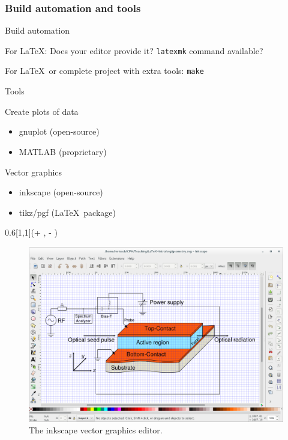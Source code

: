 \documentclass{tum-presentation}
\begin{document}
\begin{frame}
  \frametitle{Build automation and tools}
  Build automation
  \begin{PraesentationAufzaehlung}
  \item For \LaTeX: Does your editor provide it? \texttt{latexmk} command available?
  \item For \LaTeX~or complete project with extra tools: \texttt{make}
  \end{PraesentationAufzaehlung}

  Tools
  \begin{PraesentationAufzaehlung}
  \item Create plots of data
    \begin{itemize}
    \item gnuplot (open-source)
    \item MATLAB (proprietary)
    \end{itemize}
  \item Vector graphics
    \begin{itemize}
    \item inkscape (open-source)
    \item tikz/pgf (\LaTeX~package)
    \end{itemize}
  \end{PraesentationAufzaehlung}

  \begin{textblock*}{0.6\paperwidth}[1,1](\textwidth + \PraesentationSeitenrand, \textheight - \PraesentationSeitenrand)%
    \begin{figure}
      \includegraphics[width=0.5\paperwidth]{figures/inkscape}
      \caption{The inkscape vector graphics editor.}
    \end{figure}
  \end{textblock*}

\end{frame}
\end{document}
